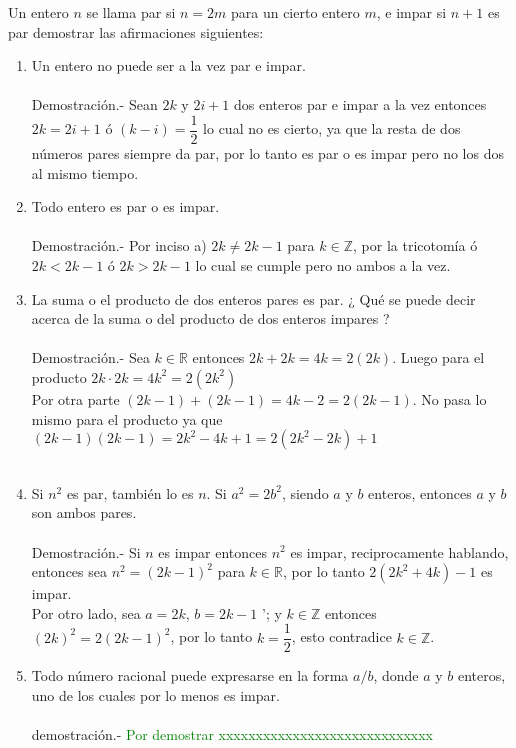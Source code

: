 \begin{teo}
Un entero $n$ se llama par si $n=2m$ para un cierto entero $m$, e impar si $n+1$ es par demostrar las afirmaciones siguientes:
\begin{enumerate}[\bfseries a)]
\item Un entero no puede ser a la vez par e impar.\\\\
Demostración.- \; Sean $2k$ y $2i+1$ dos enteros par e impar a la vez  entonces $2k=2i+1$ ó  $(k-i)=\dfrac{1}{2}$  lo cual no es cierto, ya que la resta de dos números pares siempre da par, por lo tanto es par o es impar pero no los dos al mismo tiempo.\\
\item Todo entero es par o es impar.\\\\
Demostración.- \; Por inciso a) \; $2k\neq 2k-1$ para $k\in \mathbb{Z}$, por la tricotomía ó $2k < 2k-1$ ó $2k > 2k-1$ lo cual se cumple pero no ambos a la vez.\\  
\item La suma o el producto de dos enteros pares es par. ¿ Qué se puede decir acerca de la suma o del producto de dos enteros impares ?\\\\
Demostración.- \; Sea $k\in \mathbb{R}$ entonces $2k+2k=4k=2(2k)$. Luego para el producto $2k\cdot 2k = 4k^2=2(2k^2)$\\
Por otra parte $(2k-1)+(2k-1)=4k-2=2(2k-1)$. No pasa lo mismo para el producto ya que  $(2k-1)(2k-1)=2k^2-4k+1=2(2k^2-2k)+1$\\\\
\item Si $n^2$ es par, también lo es $n$. Si $a^2=2b^2$, siendo $a$ y $b$ enteros, entonces $a$ y $b$ son ambos pares.\\\\
Demostración.- \;  Si $n$ es impar entonces $n^2$ es impar, reciprocamente hablando, entonces sea $n^2=(2k-1)^2$ para $k\in \mathbb{R}$, por lo tanto $2(2k^2+4k)-1$ es impar.\\
Por otro lado, sea $a=2k$, $b=2k-1$ '; y \; $k\in \mathbb{Z}$ entonces $(2k)^2=2(2k-1)^2$, por lo tanto $k=\dfrac{1}{2}$, esto contradice $k\in \mathbb{Z}$.\\
\item Todo número racional puede expresarse en la forma $a/b$, donde $a$ y $b$ enteros, uno de los cuales por lo menos es impar.\\\\
demostración.- \;  \textcolor{green}{Por demostrar xxxxxxxxxxxxxxxxxxxxxxxxxxxxx}
\end{enumerate}
\end{teo}

